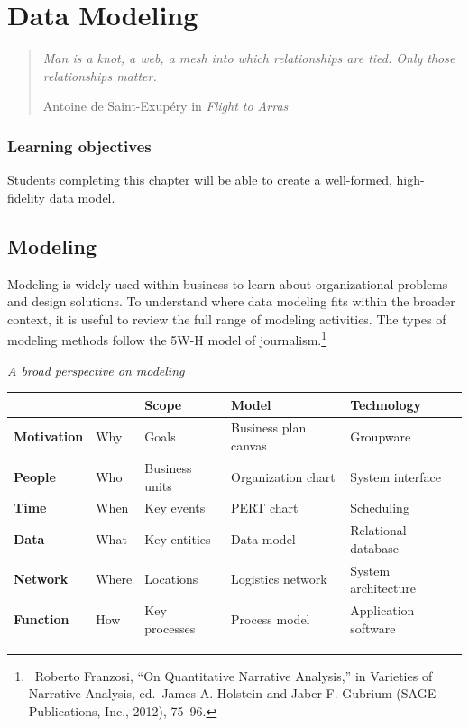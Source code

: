 \documentclass[
]{article}
\begin{document}
\hypertarget{data-modeling}{%
\section{Data Modeling}\label{data-modeling}}

\begin{quote}
\emph{Man is a knot, a web, a mesh into which relationships are tied. Only
those relationships matter.}

Antoine de Saint-Exupéry in \emph{Flight to Arras}
\end{quote}

\hypertarget{learning-objectives-6}{%
\subsubsection*{Learning objectives}\label{learning-objectives-6}}

Students completing this chapter will be able to create a well-formed,
high-fidelity data model.

\hypertarget{modeling}{%
\subsection*{Modeling}\label{modeling}}

Modeling is widely used within business to learn about organizational
problems and design solutions. To understand where data modeling fits
within the broader context, it is useful to review the full range of
modeling activities. The types of modeling methods follow the 5W-H model
of journalism.\footnote{~Roberto Franzosi, ``On Quantitative Narrative
  Analysis,'' in Varieties of Narrative Analysis, ed.~James A. Holstein
  and Jaber F. Gubrium (SAGE Publications, Inc., 2012), 75--96.}

\emph{A broad perspective on modeling}

\begin{longtable}[]{@{}lllll@{}}
\toprule
& & \textbf{Scope} & \textbf{Model} & \textbf{Technology} \\
\midrule
\endhead
\textbf{Motivation} & Why & Goals & Business plan canvas & Groupware \\
\textbf{People} & Who & Business units & Organization chart & System interface \\
\textbf{Time} & When & Key events & PERT chart & Scheduling \\
\textbf{Data} & What & Key entities & Data model & Relational database \\
\textbf{Network} & Where & Locations & Logistics network & System architecture \\
\textbf{Function} & How & Key processes & Process model & Application software \\
\bottomrule
\end{longtable}
\end{document}
